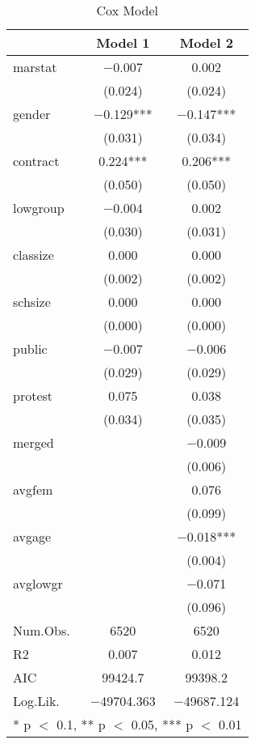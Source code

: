 \documentclass[
]{article}
\begin{document}
\begin{table}[!h]

\caption{\label{tab:unnamed-chunk-23}Cox Model}
\centering
\fontsize{8}{10}\selectfont
\begin{tabular}[t]{lcc}
\toprule
  & Model 1 & Model 2\\
\midrule
marstat & \num{-0.007} & \num{0.002}\\
 & (\num{0.024}) & (\num{0.024})\\
gender & \num{-0.129}*** & \num{-0.147}***\\
 & (\num{0.031}) & (\num{0.034})\\
contract & \num{0.224}*** & \num{0.206}***\\
 & (\num{0.050}) & (\num{0.050})\\
lowgroup & \num{-0.004} & \num{0.002}\\
 & (\num{0.030}) & (\num{0.031})\\
classize & \num{0.000} & \num{0.000}\\
 & (\num{0.002}) & (\num{0.002})\\
schsize & \num{0.000} & \num{0.000}\\
 & (\num{0.000}) & (\num{0.000})\\
public & \num{-0.007} & \num{-0.006}\\
 & (\num{0.029}) & (\num{0.029})\\
protest & \num{0.075} & \num{0.038}\\
 & (\num{0.034}) & (\num{0.035})\\
merged &  & \num{-0.009}\\
 &  & (\num{0.006})\\
avgfem &  & \num{0.076}\\
 &  & (\num{0.099})\\
avgage &  & \num{-0.018}***\\
 &  & (\num{0.004})\\
avglowgr &  & \num{-0.071}\\
 &  & (\num{0.096})\\
\midrule
Num.Obs. & \num{6520} & \num{6520}\\
R2 & \num{0.007} & \num{0.012}\\
AIC & \num{99424.7} & \num{99398.2}\\
Log.Lik. & \num{-49704.363} & \num{-49687.124}\\
\bottomrule
\multicolumn{3}{l}{\rule{0pt}{1em}* p $<$ 0.1, ** p $<$ 0.05, *** p $<$ 0.01}\\
\end{tabular}
\end{table}
\end{document}
